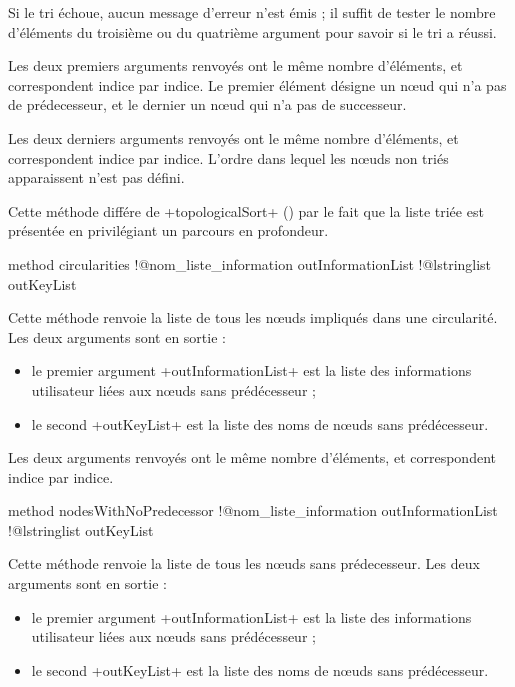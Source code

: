 Si le tri échoue, aucun message d'erreur n'est émis ; il suffit de tester le nombre d'éléments du troisième ou du quatrième argument pour savoir si le tri a réussi.

Les deux premiers arguments renvoyés ont le même nombre d'éléments, et correspondent indice par indice. Le premier élément désigne un nœud qui n'a pas de prédecesseur, et le dernier un nœud qui n'a pas de successeur.


Les deux derniers arguments renvoyés ont le même nombre d'éléments, et correspondent indice par indice. L'ordre dans lequel les nœuds non triés apparaissent n'est pas défini.

Cette méthode différe de \ggst+topologicalSort+ () par le fait que la liste triée est présentée en privilégiant un parcours en profondeur.







\begin{galgas3}
method circularities
  !@nom_liste_information outInformationList
  !@lstringlist outKeyList
\end{galgas3}

Cette méthode renvoie la liste de tous les nœuds impliqués dans une circularité. Les deux arguments sont en sortie :
\begin{itemize}
  \item le premier argument \ggst+outInformationList+ est la liste des informations utilisateur liées aux nœuds sans prédécesseur ;
  \item le second \ggst+outKeyList+ est la liste des noms de nœuds sans prédécesseur.
\end{itemize}

Les deux arguments renvoyés ont le même nombre d'éléments, et correspondent indice par indice.







\begin{galgas3}
method nodesWithNoPredecessor
  !@nom_liste_information outInformationList
  !@lstringlist outKeyList
\end{galgas3}

Cette méthode renvoie la liste de tous les nœuds sans prédecesseur. Les deux arguments sont en sortie :
\begin{itemize}
  \item le premier argument \ggst+outInformationList+ est la liste des informations utilisateur liées aux nœuds sans prédécesseur ;
  \item le second \ggst+outKeyList+ est la liste des noms de nœuds sans prédécesseur.
\end{itemize}

